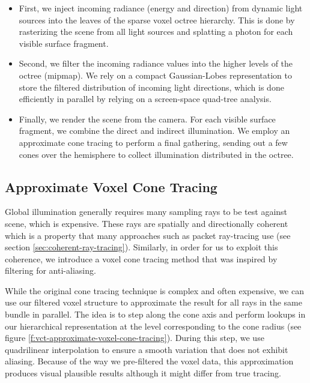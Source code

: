\begin{itemize}
	\item First, we inject incoming radiance (energy and direction) from dynamic light sources into the leaves of the sparse voxel octree hierarchy. This is done by rasterizing the scene from all light sources and splatting a photon for each visible surface fragment.
	\item Second, we filter the incoming radiance values into the higher levels of the octree (mipmap). We rely on a compact Gaussian-Lobes representation to store the filtered distribution of incoming light directions, which is done efficiently in parallel by relying on a screen-space quad-tree analysis.
	\item Finally, we render the scene from the camera. For each visible surface fragment, we combine the direct and indirect illumination. We employ an approximate cone tracing to perform a final gathering, sending out a few cones over the hemisphere to collect illumination distributed in the octree.
\end{itemize}




\subsection{Approximate Voxel Cone Tracing}
Global illumination generally requires many sampling rays to be test against scene, which is expensive. These rays are spatially and directionally coherent which is a property that many approaches such as packet ray-tracing use\cite{a:InteractiveRenderingwithCoherentRayTracing} (see section \ref{sec:coherent-ray-tracing}). Similarly, in order for us to exploit this coherence, we introduce a voxel cone tracing method that was inspired by filtering for anti-aliasing\cite{a:RayTracingwithCones}. 

While the original cone tracing technique is complex and often expensive, we can use our filtered voxel structure to approximate the result for all rays in the same bundle in parallel. The idea is to step along the cone axis and perform lookups in our hierarchical representation at the level corresponding to the cone radius (see figure \ref{f:vct-approximate-voxel-cone-tracing}). During this step, we use quadrilinear interpolation to ensure a smooth variation that does not exhibit aliasing. Because of the way we pre-filtered the voxel data, this approximation produces visual plausible results although it might differ from true tracing. 

